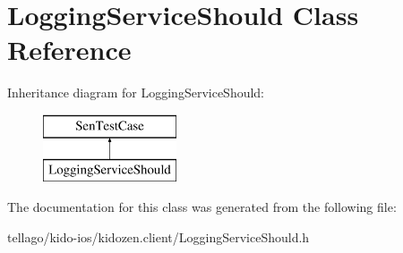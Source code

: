 \hypertarget{interface_logging_service_should}{\section{Logging\-Service\-Should Class Reference}
\label{interface_logging_service_should}
}
Inheritance diagram for Logging\-Service\-Should\-:\begin{figure}[H]
\begin{center}
\leavevmode
\includegraphics[height=2.000000cm]{interface_logging_service_should}
\end{center}
\end{figure}


The documentation for this class was generated from the following file\-:\begin{DoxyCompactItemize}
\item 
tellago/kido-\/ios/kidozen.\-client/Logging\-Service\-Should.\-h\end{DoxyCompactItemize}
